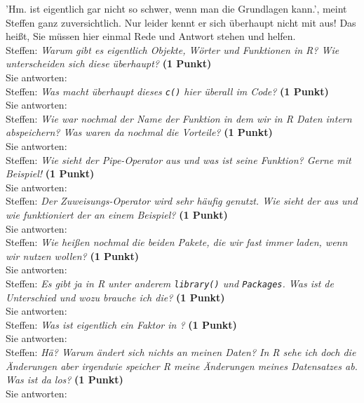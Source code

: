 \documentclass[a4paper, 9pt]{scrartcl}\usepackage[]{graphicx}\usepackage[]{xcolor}
\begin{document}
'Hm. \Rlogo ist eigentlich gar nicht so schwer, wenn man die Grundlagen kann.', meint  Steffen ganz zuversichtlich. Nur leider kennt er sich überhaupt nicht mit \Rlogo aus! Das heißt, Sie müssen hier einmal Rede und Antwort stehen und helfen.\\[1Ex]

Steffen: \textit{Warum gibt es eigentlich Objekte, Wörter und Funktionen in R? Wie unterscheiden sich diese überhaupt?} \textbf{(1 Punkt)}\\[1ex]
Sie antworten:\\[2Ex]

Steffen: \textit{Was macht überhaupt dieses \texttt{c()} hier überall im \Rlogo Code?} \textbf{(1 Punkt)}\\[1ex]
Sie antworten:\\[2Ex]

Steffen: \textit{Wie war nochmal der Name der Funktion in dem wir in R Daten intern abspeichern? Was waren da nochmal die Vorteile?} \textbf{(1 Punkt)}\\[1ex]
Sie antworten:\\[2Ex]

Steffen: \textit{Wie sieht der Pipe-Operator aus und was ist seine Funktion? Gerne mit Beispiel!} \textbf{(1 Punkt)}\\[1ex]
Sie antworten:\\[2Ex]

Steffen: \textit{Der Zuweisungs-Operator wird sehr häufig genutzt. Wie sieht der aus und wie funktioniert der an einem Beispiel?} \textbf{(1 Punkt)}\\[1ex]
Sie antworten:\\[2Ex]

Steffen: \textit{Wie heißen nochmal die beiden \Rlogo Pakete, die wir fast immer laden, wenn wir \Rlogo nutzen wollen?} \textbf{(1 Punkt)}\\[1ex]
Sie antworten:\\[2Ex]

Steffen: \textit{Es gibt ja in R unter anderem \texttt{library()} und \texttt{Packages}. Was ist de Unterschied und wozu brauche ich die?} \textbf{(1 Punkt)}\\[1ex]
Sie antworten:\\[2Ex]

Steffen: \textit{Was ist eigentlich ein Faktor in \Rlogo?} \textbf{(1 Punkt)}\\[1ex]
Sie antworten:\\[2Ex]

Steffen: \textit{Hä? Warum ändert sich nichts an meinen Daten? In R sehe ich doch die Änderungen aber irgendwie speicher R meine Änderungen meines Datensatzes ab. Was ist da los?} \textbf{(1 Punkt)}\\[1ex]
Sie antworten:\\[2Ex] 
\clearpage
\end{document}
